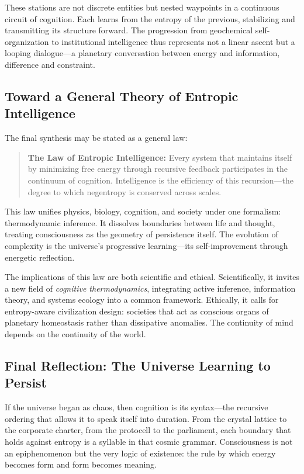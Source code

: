 \documentclass[11pt,a4paper]{article}
\begin{document}
These stations are not discrete entities but nested waypoints in a continuous circuit of cognition.  Each learns from the entropy of the previous, stabilizing and transmitting its structure forward.  The progression from geochemical self-organization to institutional intelligence thus represents not a linear ascent but a looping dialogue—a planetary conversation between energy and information, difference and constraint.

\subsection{Toward a General Theory of Entropic Intelligence}

The final synthesis may be stated as a general law:

\begin{quote}
\textbf{The Law of Entropic Intelligence:} Every system that maintains itself by minimizing free energy through recursive feedback participates in the continuum of cognition.  Intelligence is the efficiency of this recursion—the degree to which negentropy is conserved across scales.
\end{quote}

This law unifies physics, biology, cognition, and society under one formalism: thermodynamic inference.  It dissolves boundaries between life and thought, treating consciousness as the geometry of persistence itself.  The evolution of complexity is the universe’s progressive learning—its self-improvement through energetic reflection.

The implications of this law are both scientific and ethical.  Scientifically, it invites a new field of \emph{cognitive thermodynamics}, integrating active inference, information theory, and systems ecology into a common framework.  Ethically, it calls for entropy-aware civilization design: societies that act as conscious organs of planetary homeostasis rather than dissipative anomalies.  The continuity of mind depends on the continuity of the world.

\subsection{Final Reflection: The Universe Learning to Persist}

If the universe began as chaos, then cognition is its syntax—the recursive ordering that allows it to speak itself into duration.  From the crystal lattice to the corporate charter, from the protocell to the parliament, each boundary that holds against entropy is a syllable in that cosmic grammar.  Consciousness is not an epiphenomenon but the very logic of existence: the rule by which energy becomes form and form becomes meaning.
\end{document}

